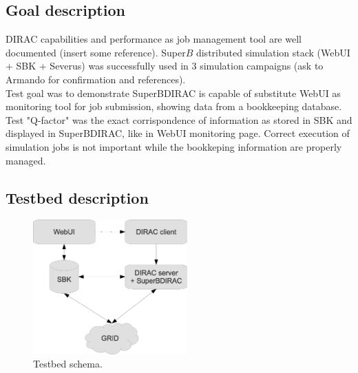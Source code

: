 \documentclass[a4paper]{jpconf}
\begin{document}
\subsection{Goal description}
DIRAC capabilities and performance as job management tool are well documented (insert some reference). Super$B$ distributed simulation stack (WebUI + SBK + Severus) was successfully used in 3 simulation campaigns (ask to Armando for confirmation and references).\\
Test goal was to demonstrate SuperBDIRAC is capable of substitute WebUI as monitoring tool for job submission, showing data from a bookkeeping database. Test "Q-factor" was the exact corrispondence of information as stored in SBK and displayed in SuperBDIRAC, like in WebUI monitoring page. Correct execution of simulation jobs is not important while the bookkeping information are properly managed.

\subsection{Testbed description}

\begin{figure}[h]
\includegraphics[width=14pc]{img/testbed.eps}\hspace{2pc}%
\begin{minipage}[b]{14pc}\caption{\label{label}Testbed schema.}
\end{minipage}
\end{figure}
\end{document}
